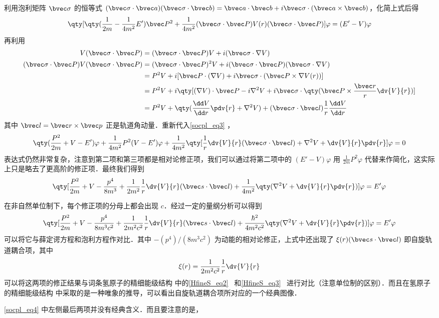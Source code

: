 利用泡利矩阵 $\bvec \sigma$ 的恒等式  $(\bvec \sigma\cdot \bvec a)(\bvec \sigma\cdot \bvec b)=\bvec a\cdot \bvec b+i\bvec \sigma\cdot (\bvec a\times \bvec b)$，化简上式后得
\begin{equation}\label{socpl_eq3}
\qty[\qty(\frac{1}{2m}-\frac{1}{4m^2}E')\bvec P^2+\frac{1}{4m^2}(\bvec \sigma\cdot \bvec P)V(r)(\bvec \sigma\cdot \bvec P)]\varphi=(E'-V)\varphi
\end{equation}
再利用
\begin{equation}
\begin{aligned}
V(\bvec \sigma\cdot \bvec P)&=(\bvec \sigma\cdot \bvec P)V+i (\bvec \sigma\cdot \nabla V)\\
(\bvec \sigma\cdot \bvec P)V(\bvec \sigma\cdot \bvec P)&=(\bvec \sigma\cdot \bvec P)^2 V+i (\bvec \sigma\cdot \bvec P)(\bvec \sigma\cdot \nabla V)\\
&=P^2 V+i [\bvec P\cdot (\nabla V)+i\bvec \sigma \cdot (\bvec P\times \nabla V(r))]\\
&=P^2V+i\qty[(\nabla V)\cdot \bvec P-i\nabla^2 V+i\bvec \sigma\cdot\qty(\bvec P\times \frac{\bvec r}{r}\dv{V}{r})]\\
&=P^2V+\qty(\frac{\dd V}{\dd r}\pdv{r} + \nabla^2 V)+(\bvec \sigma\cdot \bvec l)\frac{1}{r}\frac{\dd V}{\dd r}
\end{aligned}
\end{equation}
其中 $\bvec l=\bvec r\times \bvec p$ 正是轨道角动量．重新代入\autoref{socpl_eq3} ，
\begin{equation}
\qty(\frac{P^2}{2m}+V-E')\varphi+\frac{1}{4m^2}P^2(V-E')\varphi + \frac{1}{4m^2}\qty[\frac{1}{r}\dv{V}{r}(\bvec \sigma\cdot\bvec l)+\nabla^2 V+\dv{V}{r}\pdv{r}]\varphi = 0
\end{equation}
表达式仍然非常复杂，注意到第二项和第三项都是相对论修正项，我们可以通过将第二项中的 $(E'-V)\varphi$ 用 $\frac{1}{2m}P^2\varphi$ 代替来作简化，这实际上只是略去了更高阶的修正项．最终我们得到
\begin{equation}
\qty[\frac{P^2}{2m}+V-\frac{p^4}{8m^3}+\frac{1}{2m^2}\frac{1}{r}\dv{V}{r}(\bvec s\cdot \bvec l)+\frac{1}{4m^2}\qty(\nabla^2 V+\dv{V}{r}\pdv{r})]\varphi = E'\varphi
\end{equation}

在非自然单位制下，每个修正项的分母上都会出现 $c$．经过一定的量纲分析可以得到
\begin{equation}\label{socpl_eq4}
\qty[\frac{P^2}{2m}+V-\frac{p^4}{8m^3c^2}+\frac{1}{2m^2c^2}\frac{1}{r}\dv{V}{r}(\bvec s\cdot \bvec l)+\frac{\hbar^2}{4m^2c^2}\qty(\nabla^2 V+\dv{V}{r}\pdv{r})]\varphi = E'\varphi
\end{equation}
可以将它与薛定谔方程和泡利方程作对比．其中 $-(p^4)/(8m^3c^2)$ 为动能的相对论修正，上式中还出现了 $\xi(r)(\bvec s\cdot \bvec l)$ 即自旋轨道耦合项，其中
\begin{equation}
\xi(r)=\frac{1}{2m^2c^2}\frac{1}{r}\dv{V}{r}
\end{equation}
可以将这两项的修正结果与词条氢原子的精细能级结构 中的\autoref{HfineS_eq2}~ 和\autoref{HfineS_eq3}~ 进行对比（注意单位制的区别）．而且在氢原子的精细能级结构 中采取的是一种唯象的推导，可以看出自旋轨道耦合项所对应的一个经典图像．

\autoref{socpl_eq4} 中左侧最后两项并没有经典含义．而且要注意的是，$$